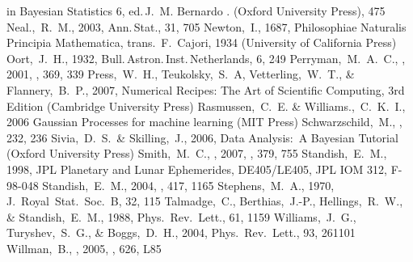 \begin{thebibliography}{99}
  in Bayesian Statistics 6,
  ed.\,J.~M. Bernardo \etal. (Oxford University Press), 475
  Neal.,~R.~M., 2003,
  Ann.\,Stat., 31, 705
  Newton,~I., 1687,
  Philosophiae Naturalis Principia Mathematica,
  trans.\ F.~Cajori, 1934
  (University of California Press)
  Oort,~J.~H., 1932,
  Bull.\,Astron.\,Inst.\,Netherlands, 6, 249
  Perryman,~M.~A.~C., \etal, 2001,
  \aap, 369, 339
  Press,~W.~H., Teukolsky,~S.~A, Vetterling,~W.~T., \& Flannery,~B.~P., 2007,
  Numerical Recipes: The Art of Scientific Computing, 3rd Edition (Cambridge University Press)
  Rasmussen,~C.~E. \& Williams.,~C.~K.~I., 2006
  Gaussian Processes for machine learning (MIT Press)
  Schwarzschild,~M.,
  \apj, 232, 236
  Sivia,~D.~S.~\& Skilling,~J., 2006,
  Data Analysis:\ A Bayesian Tutorial (Oxford University Press)
  Smith,~M.~C., \etal, 2007,
  \mnras, 379, 755
  Standish,~E.~M., 1998,
  JPL Planetary and Lunar Ephemerides, DE405/LE405,
  JPL IOM 312, F-98-048
  Standish,~E.~M., 2004,
  \aap, 417, 1165
  Stephens,~M.~A., 1970,
  J.~Royal~Stat.~Soc.~B, 32, 115
  Talmadge,~C., Berthias,~J.-P., Hellings,~R.~W., \& Standish,~E.~M., 1988,
  Phys.~Rev.~Lett., 61, 1159
  Williams,~J.~G., Turyshev,~S.~G., \& Boggs,~D.~H., 2004,
  Phys.~Rev.~Lett., 93, 261101
  Willman,~B., \etal, 2005,
  \apjl, 626, L85



\end{thebibliography}
